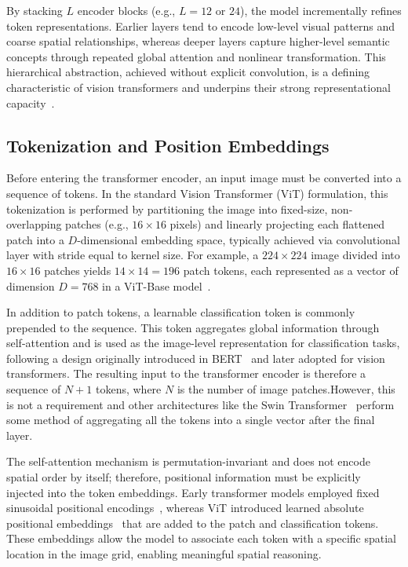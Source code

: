 \documentclass[runningheads,a4paper]{llncs}
\begin{document}
By stacking $L$ encoder blocks (e.g., $L=12$ or $24$), the model incrementally refines token representations. Earlier layers tend to encode low-level visual patterns and coarse spatial relationships, whereas deeper layers capture higher-level semantic concepts through repeated global attention and nonlinear transformation. This hierarchical abstraction, achieved without explicit convolution, is a defining characteristic of vision transformers and underpins their strong representational capacity~\cite{dorszewski2025concepts_vit}.

\subsection{Tokenization and Position Embeddings}
Before entering the transformer encoder, an input image must be converted into a sequence of tokens. In the standard Vision Transformer (ViT) formulation, this tokenization is performed by partitioning the image into fixed-size, non-overlapping patches (e.g., $16\times16$ pixels) and linearly projecting each flattened patch into a $D$-dimensional embedding space, typically achieved via convolutional layer with stride equal to kernel size. For example, a $224\times224$ image divided into $16\times16$ patches yields $14\times14=196$ patch tokens, each represented as a vector of dimension $D=768$ in a ViT-Base model~\cite{dosovitskiy2021vit}.

In addition to patch tokens, a learnable classification token is commonly prepended to the sequence. This token aggregates global information through self-attention and is used as the image-level representation for classification tasks, following a design originally introduced in BERT~\cite{devlin2019bert} and later adopted for vision transformers. The resulting input to the transformer encoder is therefore a sequence of $N+1$ tokens, where $N$ is the number of image patches.However, this is not a requirement and other architectures like the Swin Transformer~\cite{liu2021swin} perform some method of aggregating all the tokens into a single vector after the final layer.

The self-attention mechanism is permutation-invariant and does not encode spatial order by itself; therefore, positional information must be explicitly injected into the token embeddings. Early transformer models employed fixed sinusoidal positional encodings~\cite{vaswani2017attention}, whereas ViT introduced learned absolute positional embeddings~\cite{dosovitskiy2021vit} that are added to the patch and classification tokens. These embeddings allow the model to associate each token with a specific spatial location in the image grid, enabling meaningful spatial reasoning.
\end{document}
